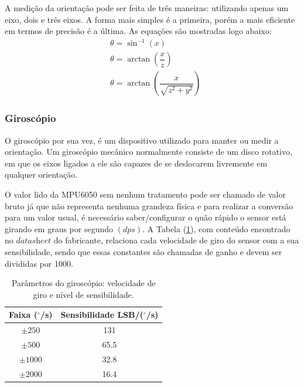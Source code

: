 A medição da orientação pode ser feita de três maneiras: utilizando apenas um eixo, dois e três eixos. A forma mais simples é a primeira, porém a mais eficiente em termos de precisão é a última. As equações são mostradas logo abaixo:
\begin{equation}
    \begin{array}{ccc}
         &  \theta = \sin^{-1}(x) \\[10pt]
         &  \theta = \arctan \left(\dfrac{x}{z}\right)  \\[10pt]
         &  \theta = \arctan \left(\dfrac{x}{\sqrt{z^2+y^2}}\right)
    \end{array}{}
\end{equation}{}

\subsubsection{Giroscópio}
O giroscópio por sua vez, é um dispositivo utilizado para manter ou medir a orientação. Um giroscópio mecânico normalmente consiste de um disco rotativo, em que os eixos ligados a ele são capazes de se deslocarem livremente em qualquer orientação. 

O valor lido da MPU6050 sem nenhum tratamento pode ser chamado de valor bruto já que não representa nenhuma grandeza física e para realizar a conversão para um valor usual, é necessário saber/configurar o quão rápido o sensor está girando em graus por segundo $(dps)$. A Tabela (\ref{tab:ParamGiroMPU}), com conteúdo encontrado no $\textit{datasheet}$ do fabricante, relaciona cada velocidade de giro do sensor com a sua sensibilidade, sendo que essas constantes são chamadas de ganho e devem ser divididas por 1000.
\begin{table}[!htb]
    \centering
    \caption{Parâmetros do giroscópio: velocidade de giro e nível de sensibilidade.}
    \label{tab:ParamGiroMPU}
    \begin{tabular}{@{}cc@{}}
        \toprule
        \textbf{Faixa ($^{\circ}$/s)} & \textbf{Sensibilidade LSB/($^{\circ}$/s)} \\ \midrule
        $\pm 250$                    & 131                                                   \\
        $\pm 500$                    & 65.5                                                  \\
        $\pm 1000$                   & 32.8                                                  \\
        $\pm 2000$                   & 16.4                                                  \\ \bottomrule
    \end{tabular}
\end{table}

